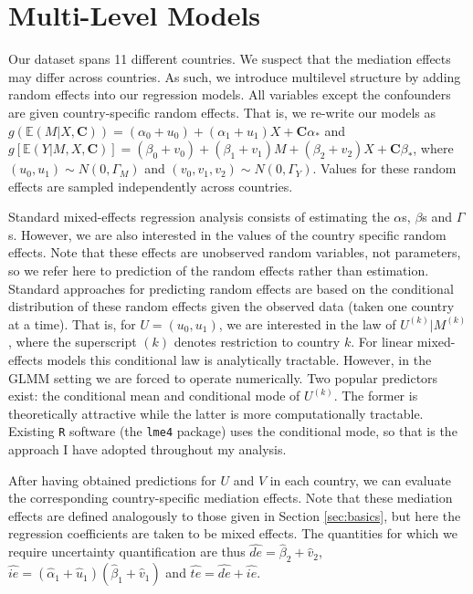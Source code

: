 \documentclass{article}
\newcommand{\bE}{\mathbb{E}}
\newcommand{\C}{\mathbf{C}}
\begin{document}

\section{Multi-Level Models}
\label{sec:multi_level}

Our dataset spans 11 different countries. We suspect that the mediation effects may differ across countries. As such, we introduce multilevel structure by adding random effects into our regression models. All variables except the confounders are given country-specific random effects. That is, we re-write our models as $g(\bE(M | X, \C)) = (\alpha_0 + u_0) + (\alpha_1 + u_1) X + \C \alpha_*$ and $g[\bE(Y | M, X, \C)] = (\beta_0 + v_0) + (\beta_1 + v_1) M + (\beta_2 + v_2) X + \C \beta_*$, where $(u_0, u_1) \sim N(0, \Gamma_M)$ and $(v_0, v_1, v_2) \sim N(0, \Gamma_Y)$. Values for these random effects are sampled independently across countries.

Standard mixed-effects regression analysis consists of estimating the $\alpha$s, $\beta$s and $\Gamma$s. However, we are also interested in the values of the country specific random effects. Note that these effects are unobserved random variables, not parameters, so we refer here to prediction of the random effects rather than estimation. Standard approaches for predicting random effects are based on the conditional distribution of these random effects given the observed data (taken one country at a time). That is, for $U = (u_0, u_1)$, we are interested in the law of $U^{(k)} | M^{(k)}$, where the superscript $(k)$ denotes restriction to country $k$. For linear mixed-effects models this conditional law is analytically tractable. However, in the GLMM setting we are forced to operate numerically. Two popular predictors exist: the conditional mean and conditional mode of $U^{(k)}$. The former is theoretically attractive while the latter is more computationally tractable. Existing \texttt{R} software (the \texttt{lme4} package) uses the conditional mode, so that is the approach I have adopted throughout my analysis.

After having obtained predictions for $U$ and $V$ in each country, we can evaluate the corresponding country-specific mediation effects. Note that these mediation effects are defined analogously to those given in Section \ref{sec:basics}, but here the regression coefficients are taken to be mixed effects. The quantities for which we require uncertainty quantification are thus $\hat{de} = \hat{\beta}_2 + \hat{v}_2$, $\hat{ie} = (\hat{\alpha}_1 + \hat{u}_1) (\hat{\beta}_1 + \hat{v}_1)$ and $\hat{te} = \hat{de} + \hat{ie}$.
\end{document}
